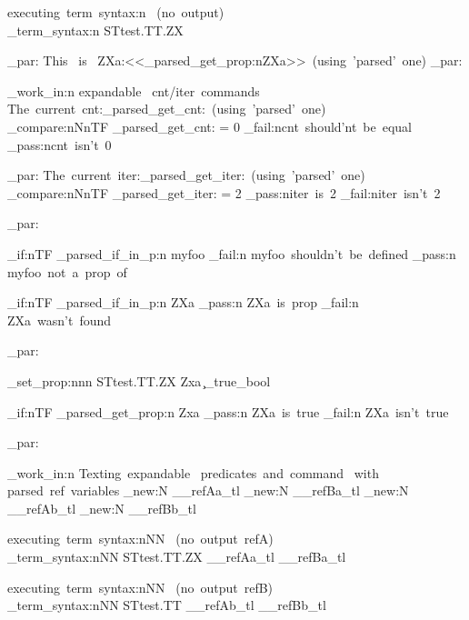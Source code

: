 \documentclass{article}
\begin{document}
executing~term~syntax:n ~(no~output)\\
\starray_term_syntax:n {STtest.TT.ZX}

\sttests_par:
This~ is~ ZXa:<<\starray_parsed_get_prop:n{ZXa}>>~(using~'parsed'~one)
\sttests_par:

\sttests_work_in:n {expandable~ cnt/iter~commands}
The~current~cnt:\starray_parsed_get_cnt:~(using~'parsed'~one)\\

\int_compare:nNnTF {\starray_parsed_get_cnt:} = {0}
  {\sttests_fail:n{cnt~should'nt~be~equal}} 
  {\sttests_pass:n{cnt~isn't~0}}
  
\sttests_par:
The~current~iter:\starray_parsed_get_iter:~(using~'parsed'~one)\\

\int_compare:nNnTF {\starray_parsed_get_iter:} = {2}
  {\sttests_pass:n{iter~is~2}} 
  {\sttests_fail:n{iter~isn't~2}}



\sttests_par:

\bool_if:nTF { \starray_parsed_if_in_p:n {myfoo} }
  {  \sttests_fail:n {myfoo~shouldn't~be~defined } }
  {   \sttests_pass:n {myfoo~not~a~prop~of } }

\bool_if:nTF { \starray_parsed_if_in_p:n {ZXa} }
  {  \sttests_pass:n {ZXa~is~prop } }
  {   \sttests_fail:n {ZXa~wasn't~found } }





\sttests_par:


  
\starray_set_prop:nnn {STtest.TT.ZX}  {Zxa} {\c_true_bool}

\bool_if:nTF { \starray_parsed_get_prop:n {Zxa} }
  {  \sttests_pass:n {ZXa~is~true } }
  {   \sttests_fail:n {ZXa~isn't~true } }
  
  
  \sttests_par:
  
  
\sttests_work_in:n {Texting~expandable~ predicates~and~command~ with~ parsed~ref~variables}
\tl_new:N \__refAa_tl
\tl_new:N \__refBa_tl
\tl_new:N \__refAb_tl
\tl_new:N \__refBb_tl



executing~term~syntax:nNN ~(no~output~refA)\\
\starray_term_syntax:nNN {STtest.TT.ZX} \__refAa_tl \__refBa_tl

executing~term~syntax:nNN ~(no~output~refB)\\
\starray_term_syntax:nNN {STtest.TT} \__refAb_tl \__refBb_tl
\end{document}
